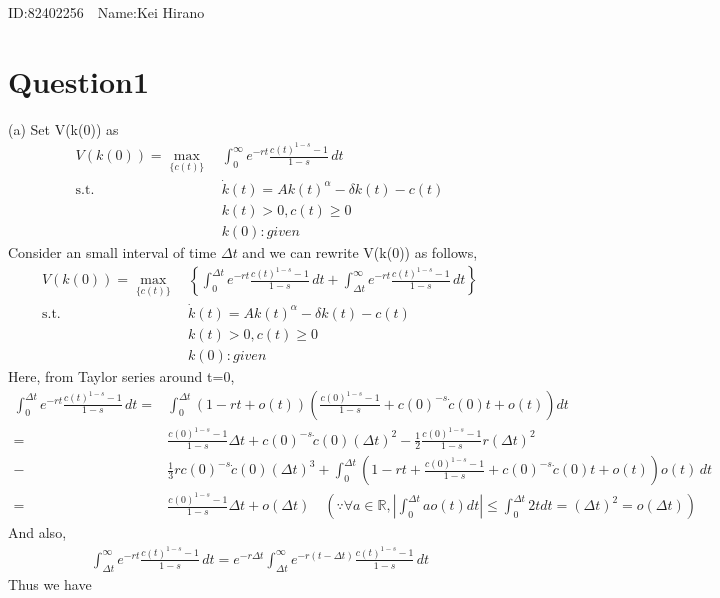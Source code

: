 \documentclass{article}
\begin{document}
\begin{CJK}{UTF8}{min}
\begin{flushright} %
ID:82402256　Name:Kei Hirano\\
\end{flushright}
\section*{Question1}
(a)\quad
Set V(k(0)) as
\begin{align*}
V(k(0))=\max_{\{c(t)\}} \, &\int_0^\infty e^{-rt}\frac{c(t)^{1-s}-1}{1-s}\,dt\\
\mathrm{s.t.} \,\,&\dot k(t)=Ak(t)^\alpha -\delta k(t)-c(t)\\
&k(t)>0,c(t)\geq0\\
&k(0):given
\end{align*}
Consider an small interval of time $\Delta t$ and we can rewrite V(k(0)) as follows, 
\begin{align*}
V(k(0))=\max_{\{c(t)\}} \, &\left\{\int_0^{\Delta t}e^{-rt}\frac{c(t)^{1-s}-1}{1-s}\,dt+\int_{\Delta t} ^\infty e^{-rt}\frac{c(t)^{1-s}-1}{1-s}\,dt\right\}\\
\mathrm{s.t.} \,\,&\dot k(t)=Ak(t)^\alpha -\delta k(t)-c(t)\\
&k(t)>0,c(t)\geq0\\
&k(0):given
\end{align*}
Here, from Taylor series around t=0,
\begin{align*}
\int_0^{\Delta t}e^{-rt}\frac{c(t)^{1-s}-1}{1-s}\,dt=&\int_0^{\Delta t}(1-rt+o(t))\left(\frac{c(0)^{1-s}-1}{1-s}+c(0)^{-s}\dot c(0)t
+o(t)\right)dt\\=&\frac{c(0)^{1-s}-1}{1-s}\Delta t+c(0)^{-s}\dot c(0)(\Delta t)^2-\frac 12\frac{c(0)^{1-s}-1}{1-s}r(\Delta t)^2\\-&\frac13 rc(0)^{-s}\dot c(0)(\Delta t)^3+\int_0^{\Delta t}\left(1-rt+\frac{c(0)^{1-s}-1}{1-s}+c(0)^{-s}\dot c(0)t
+o(t)\right)o(t)\,dt \\=&\frac{c(0)^{1-s}-1}{1-s}\Delta t+o(\Delta t)\quad\left(\because \forall a\in \mathbb{R},\left|\int_0^{\Delta t}ao(t)dt\right|\leq\int_0^{\Delta t}2tdt=(\Delta t)^2=o(\Delta t)\right)
\end{align*}
And also, 
\begin{align*}
\int_{\Delta t} ^\infty e^{-rt}\frac{c(t)^{1-s}-1}{1-s}\,dt=e^{-r\Delta t}\int_{\Delta t} ^\infty e^{-r(t-\Delta t)}\frac{c(t)^{1-s}-1}{1-s}\,dt
\end{align*}
Thus we have
\begin{align*}

\end{align*}
\end{CJK}
\end{document}

